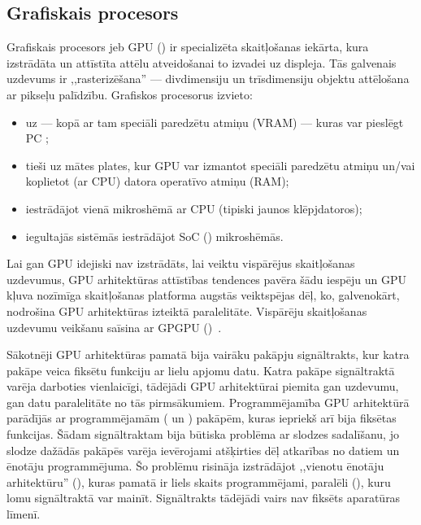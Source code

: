 \subsection{Grafiskais procesors} \label{sec:gpu}
Grafiskais procesors jeb GPU ()
ir specializēta skaitļošanas iekārta, kura izstrādāta un attīstīta
attēlu atveidošanai to izvadei uz displeja. Tās galvenais uzdevums ir
,,rasterizēšana'' --- divdimensiju un trīsdimensiju objektu attēlošana
ar pikseļu palīdzību.
Grafiskos procesorus izvieto:
\begin{itemize}
	\item uz  --- kopā ar tam speciāli paredzētu
		atmiņu (VRAM) --- kuras var pieslēgt PC ;
	\item tieši uz mātes plates, kur GPU var izmantot speciāli paredzētu
		atmiņu un/vai koplietot (ar CPU) datora operatīvo atmiņu (RAM);
	\item iestrādājot vienā mikroshēmā ar CPU (tipiski jaunos klēpjdatoros);
	\item iegultajās sistēmās iestrādājot SoC
		() mikroshēmās.
\end{itemize}

Lai gan GPU idejiski nav izstrādāts, lai veiktu vispārējus skaitļošanas
uzdevumus, GPU arhitektūras attīstības tendences pavēra šādu iespēju un GPU
kļuva nozīmīga skaitļošanas platforma augstās veiktspējas dēļ, ko,
galvenokārt, nodrošina GPU arhitektūras izteiktā paralelitāte. Vispārēju
skaitļošanas uzdevumu veikšanu saīsina ar GPGPU
()~\cite{Owens-GPU}.

Sākotnēji GPU arhitektūras pamatā bija vairāku pakāpju signāltrakts, kur
katra pakāpe veica fiksētu funkciju ar lielu apjomu datu. Katra pakāpe
signāltraktā varēja darboties vienlaicīgi, tādējādi GPU arhitektūrai
piemita gan uzdevumu, gan datu paralelitāte no tās pirmsākumiem.
Programmējamība GPU arhitektūrā parādījās ar programmējamām 
( un ) pakāpēm,
kuras iepriekš arī bija fiksētas funkcijas. Šādam signāltraktam bija būtiska
problēma ar slodzes sadalīšanu, jo slodze dažādās pakāpēs varēja ievērojami
atšķirties dēļ atkarības
no datiem un ēnotāju programmējuma. Šo problēmu risināja izstrādājot
,,vienotu ēnotāju arhitektūru'' (),
kuras pamatā ir liels skaits programmējami, paralēli
 (), kuru lomu
signāltraktā var mainīt. Signāltrakts tādējādi vairs nav fiksēts aparatūras līmenī.

